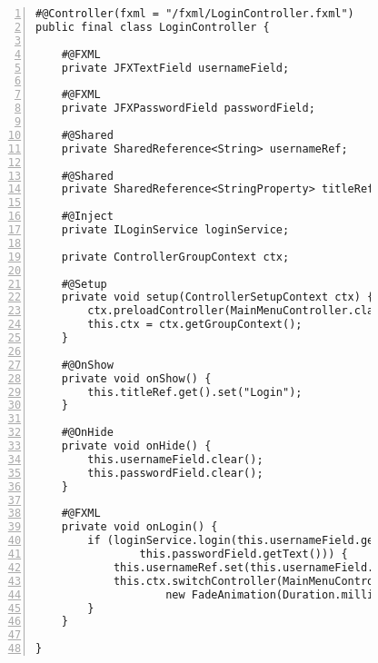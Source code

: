 \begin{figure}[H]
	\begin{lstlisting}[caption=Demo -- \texttt{LoginController}, captionpos=b, label=lst:login_controller, numbers=left, xleftmargin=1.7em, framexleftmargin=1.7em, nolol]
#@Controller(fxml = "/fxml/LoginController.fxml")
public final class LoginController {

	#@FXML
    private JFXTextField usernameField;

    #@FXML
    private JFXPasswordField passwordField;

    #@Shared
    private SharedReference<String> usernameRef;

    #@Shared
    private SharedReference<StringProperty> titleRef;

    #@Inject
    private ILoginService loginService;

    private ControllerGroupContext ctx;

    #@Setup
    private void setup(ControllerSetupContext ctx) {
        ctx.preloadController(MainMenuController.class);
        this.ctx = ctx.getGroupContext();
    }

    #@OnShow
    private void onShow() {
        this.titleRef.get().set("Login");
    }

    #@OnHide
    private void onHide() {
        this.usernameField.clear();
        this.passwordField.clear();
    }

    #@FXML
    private void onLogin() {
        if (loginService.login(this.usernameField.getText(),
				this.passwordField.getText())) {
            this.usernameRef.set(this.usernameField.getText());
            this.ctx.switchController(MainMenuController.class,
					new FadeAnimation(Duration.millis(250)));
        }
    }

}
	\end{lstlisting}
\end{figure}
